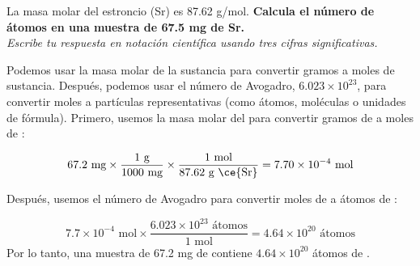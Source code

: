 La masa molar del estroncio (Sr) es 87.62 g/mol.
\textbf{Calcula el número de átomos en una muestra de 67.5 mg de Sr.}\\
\emph{Escribe tu respuesta en notación científica usando tres cifras significativas.}

\begin{solutionbox}{6cm}
    Podemos usar la masa molar de la sustancia para convertir gramos a moles de sustancia. Después, podemos usar el número de Avogadro, $6.023 \times 10^{23}$, para convertir moles a partículas representativas (como átomos, moléculas o unidades de fórmula).
    Primero, usemos la masa molar del  para convertir gramos de  a moles de :

    \[ 67.2 \text{ mg} \times \frac{1 \text{ g}}{1000 \text{ mg}} \times \frac{1 \text{ mol}}{87.62 \text{ g \ce{Sr}}} = 7.70 \times 10^{-4} \text{ mol} \]

    Después, usemos el número de Avogadro para convertir moles de  a átomos de :

    \[7.7 \times 10^{-4} \text{ mol} \times \frac{6.023 \times 10^{23} \text{ átomos}}{1 \text{ mol}} = 4.64 \times 10^{20} \text{ átomos} \]
    Por lo tanto, una muestra de 67.2 mg de  contiene $4.64 \times 10^{20}$ átomos de .
\end{solutionbox}